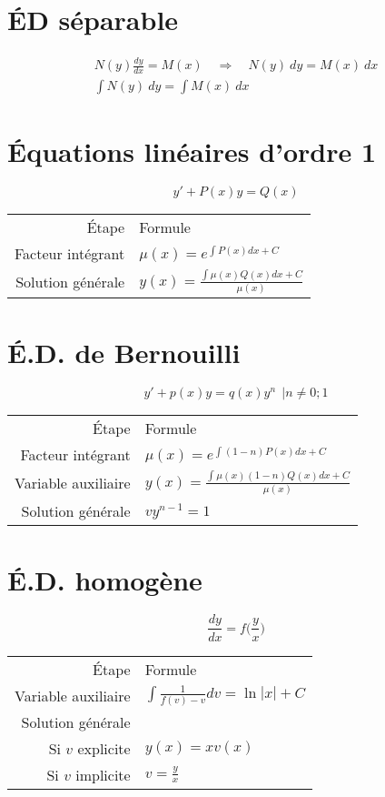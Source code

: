 \section{ÉD séparable}
\vspace{-2\baselineskip}
\begin{gather*}
    N(y)\frac{dy}{dx} = M(x) \quad \Rightarrow \quad N(y) \:dy = M(x) \:dx\\
    \int N(y) \:dy = \int M(x) \:dx
\end{gather*}

\section{Équations linéaires d'ordre 1}
\[y'+P(x)y=Q(x)\]
\centering
\begin{tabular}{rl}
 Étape & Formule\\
 Facteur intégrant & $\mu(x)=e^{\int P(x)dx + C}$ \\
 Solution générale & $y(x)=\frac{\int \mu (x) Q(x) dx +C}{\mu (x)}$
\end{tabular}

\section{É.D. de Bernouilli}
\[y\prime+p(x)y=q(x)y^{n}~~ | n\neq0;1 \]
\centering
\begin{tabular}{rl}
 Étape & Formule\\
 Facteur intégrant & $\mu(x)=e^{\int(1-n)P(x)dx + C}$ \\
 Variable auxiliaire & $y(x)=\frac{\int \mu(x)(1-n) Q(x) dx +C}{\mu (x)}$\\
 Solution générale & $v y^{n-1}=1$
\end{tabular}


\section{É.D. homogène}
\[\frac{dy}{dx}=f\bigg(\frac{y}{x}\bigg)\]
\centering
\begin{tabular}{rl}
 Étape & Formule\\
 Variable auxiliaire & $\int \frac{1}{f(v)-v}dv = \ln|x|+C$\\
 Solution générale & \\
 Si $v$ explicite & $y(x)=xv(x)$\\
 Si $v$ implicite & $v=\frac{y}{x}$
\end{tabular}



